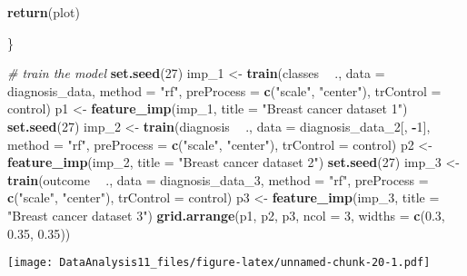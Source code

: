 \documentclass[]{article}
\newenvironment{Shaded}{\begin{snugshade}}{\end{snugshade}}
\newcommand{\KeywordTok}[1]{\textcolor[rgb]{0.13,0.29,0.53}{\textbf{#1}}}
\newcommand{\DataTypeTok}[1]{\textcolor[rgb]{0.13,0.29,0.53}{#1}}
\newcommand{\DecValTok}[1]{\textcolor[rgb]{0.00,0.00,0.81}{#1}}
\newcommand{\FloatTok}[1]{\textcolor[rgb]{0.00,0.00,0.81}{#1}}
\newcommand{\StringTok}[1]{\textcolor[rgb]{0.31,0.60,0.02}{#1}}
\newcommand{\CommentTok}[1]{\textcolor[rgb]{0.56,0.35,0.01}{\textit{#1}}}
\newcommand{\OperatorTok}[1]{\textcolor[rgb]{0.81,0.36,0.00}{\textbf{#1}}}
\newcommand{\NormalTok}[1]{#1}
\begin{document}
\begin{Shaded}
\begin{Highlighting}[]
  \KeywordTok{return}\NormalTok{(plot)}
  
\NormalTok{\}}
\end{Highlighting}
\end{Shaded}

\begin{Shaded}
\begin{Highlighting}[]
\CommentTok{# train the model}
\KeywordTok{set.seed}\NormalTok{(}\DecValTok{27}\NormalTok{)}
\NormalTok{imp_}\DecValTok{1}\NormalTok{ <-}\StringTok{ }\KeywordTok{train}\NormalTok{(classes }\OperatorTok{~}\StringTok{ }\NormalTok{., }\DataTypeTok{data =}\NormalTok{ diagnosis_data, }\DataTypeTok{method =} \StringTok{"rf"}\NormalTok{, }\DataTypeTok{preProcess =} \KeywordTok{c}\NormalTok{(}\StringTok{"scale"}\NormalTok{, }\StringTok{"center"}\NormalTok{), }\DataTypeTok{trControl =}\NormalTok{ control)}
\NormalTok{p1 <-}\StringTok{ }\KeywordTok{feature_imp}\NormalTok{(imp_}\DecValTok{1}\NormalTok{, }\DataTypeTok{title =} \StringTok{"Breast cancer dataset 1"}\NormalTok{)}
\KeywordTok{set.seed}\NormalTok{(}\DecValTok{27}\NormalTok{)}
\NormalTok{imp_}\DecValTok{2}\NormalTok{ <-}\StringTok{ }\KeywordTok{train}\NormalTok{(diagnosis }\OperatorTok{~}\StringTok{ }\NormalTok{., }\DataTypeTok{data =}\NormalTok{ diagnosis_data_}\DecValTok{2}\NormalTok{[, }\OperatorTok{-}\DecValTok{1}\NormalTok{], }\DataTypeTok{method =} \StringTok{"rf"}\NormalTok{, }\DataTypeTok{preProcess =} \KeywordTok{c}\NormalTok{(}\StringTok{"scale"}\NormalTok{, }\StringTok{"center"}\NormalTok{), }\DataTypeTok{trControl =}\NormalTok{ control)}
\NormalTok{p2 <-}\StringTok{ }\KeywordTok{feature_imp}\NormalTok{(imp_}\DecValTok{2}\NormalTok{, }\DataTypeTok{title =} \StringTok{"Breast cancer dataset 2"}\NormalTok{)}
\KeywordTok{set.seed}\NormalTok{(}\DecValTok{27}\NormalTok{)}
\NormalTok{imp_}\DecValTok{3}\NormalTok{ <-}\StringTok{ }\KeywordTok{train}\NormalTok{(outcome }\OperatorTok{~}\StringTok{ }\NormalTok{., }\DataTypeTok{data =}\NormalTok{ diagnosis_data_}\DecValTok{3}\NormalTok{, }\DataTypeTok{method =} \StringTok{"rf"}\NormalTok{, }\DataTypeTok{preProcess =} \KeywordTok{c}\NormalTok{(}\StringTok{"scale"}\NormalTok{, }\StringTok{"center"}\NormalTok{), }\DataTypeTok{trControl =}\NormalTok{ control)}
\NormalTok{p3 <-}\StringTok{ }\KeywordTok{feature_imp}\NormalTok{(imp_}\DecValTok{3}\NormalTok{, }\DataTypeTok{title =} \StringTok{"Breast cancer dataset 3"}\NormalTok{)}
\KeywordTok{grid.arrange}\NormalTok{(p1, p2, p3, }\DataTypeTok{ncol =} \DecValTok{3}\NormalTok{, }\DataTypeTok{widths =} \KeywordTok{c}\NormalTok{(}\FloatTok{0.3}\NormalTok{, }\FloatTok{0.35}\NormalTok{, }\FloatTok{0.35}\NormalTok{))}
\end{Highlighting}
\end{Shaded}

\texttt{[image: DataAnalysis11\_files/figure-latex/unnamed-chunk-20-1.pdf]}
\end{document}
